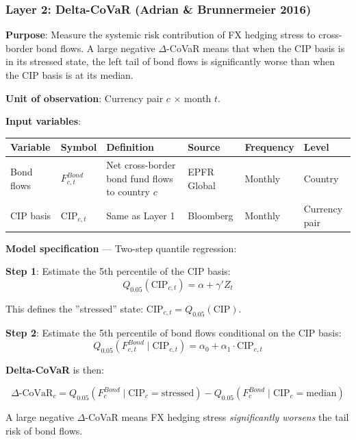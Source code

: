 \documentclass[11pt,a4paper]{article}
\begin{document}
\subsubsection{Layer 2: Delta-CoVaR (Adrian \& Brunnermeier 2016)}

\textbf{Purpose}: Measure the systemic risk contribution of FX hedging stress to cross-border bond flows. A large negative $\Delta$-CoVaR means that when the CIP basis is in its stressed state, the left tail of bond flows is significantly worse than when the CIP basis is at its median.

\textbf{Unit of observation}: Currency pair $c$ $\times$ month $t$.

\textbf{Input variables}:


{\small
\begin{longtable}{|p{}|p{}|p{}|p{}|p{}|p{}|}
\hline
\textbf{Variable} & \textbf{Symbol} & \textbf{Definition} & \textbf{Source} & \textbf{Frequency} & \textbf{Level} \\
\hline
\endhead
Bond flows & $F_{c,t}^{Bond}$ & Net cross-border bond fund flows to country $c$ & EPFR Global & Monthly & Country \\
\hline
CIP basis & $\text{CIP}_{c,t}$ & Same as Layer 1 & Bloomberg & Monthly & Currency pair \\
\hline
\end{longtable}
}

\textbf{Model specification} --- Two-step quantile regression:

\textbf{Step 1}: Estimate the 5th percentile of the CIP basis:
\[Q_{0.05}(\text{CIP}_{c,t}) = \alpha + \gamma' Z_t\]

This defines the ''stressed'' state: $\text{CIP}_{c,t} = Q_{0.05}(\text{CIP})$.

\textbf{Step 2}: Estimate the 5th percentile of bond flows conditional on the CIP basis:
\[Q_{0.05}(F_{c,t}^{Bond} \mid \text{CIP}_{c,t}) = \alpha_0 + \alpha_1 \cdot \text{CIP}_{c,t}\]

\textbf{Delta-CoVaR} is then:

\[\Delta\text{-CoVaR}_c = Q_{0.05}(F_c^{Bond} \mid \text{CIP}_c = \text{stressed}) - Q_{0.05}(F_c^{Bond} \mid \text{CIP}_c = \text{median})\]

A large negative $\Delta$-CoVaR means FX hedging stress \textit{significantly worsens} the tail risk of bond flows.
\end{document}

